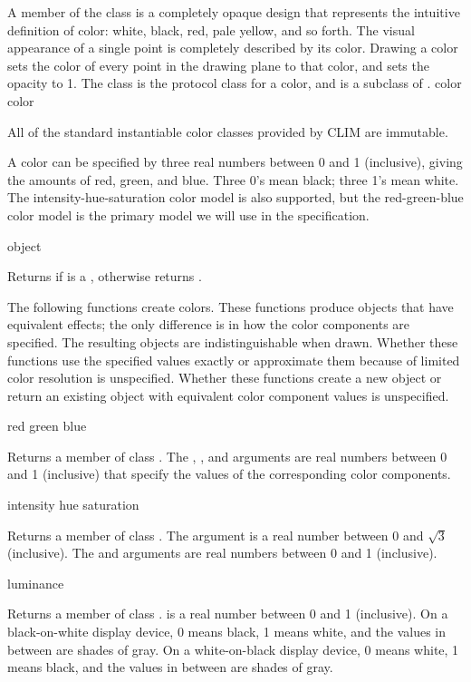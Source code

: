 
A member of the class  is a completely opaque design that represents
the intuitive definition of color: white, black, red, pale yellow, and so forth.
The visual appearance of a single point is completely described by its color.
Drawing a color sets the color of every point in the drawing plane to that
color, and sets the opacity to 1.  The  class is the protocol class
for a color, and is a subclass of .
 {color} {color}

All of the standard instantiable color classes provided by CLIM are immutable.

A color can be specified by three real numbers between 0 and 1 (inclusive),
giving the amounts of red, green, and blue.  Three 0's mean black; three 1's
mean white.  The intensity-hue-saturation color model is also supported, but the
red-green-blue color model is the primary model we will use in the
specification.

 {object}

Returns  if  is a , otherwise returns
.


The following functions create colors.  These functions produce objects that
have equivalent effects; the only difference is in how the color components are
specified.  The resulting objects are indistinguishable when drawn.  Whether
these functions use the specified values exactly or approximate them because of
limited color resolution is unspecified.  Whether these functions create a new
object or return an existing object with equivalent color component values is
unspecified.


 {red green blue}

Returns a member of class .  The , , and
 arguments are real numbers between 0 and 1 (inclusive) that specify
the values of the corresponding color components.


 {intensity hue saturation}

Returns a member of class .  The  argument is a real
number between 0 and $\sqrt{3}$ (inclusive).  The  and 
arguments are real numbers between 0 and 1 (inclusive).


 {luminance}

Returns a member of class .   is a real number between
0 and 1 (inclusive).  On a black-on-white display device, 0 means black, 1 means
white, and the values in between are shades of gray.  On a white-on-black
display device, 0 means white, 1 means black, and the values in between are
shades of gray.

